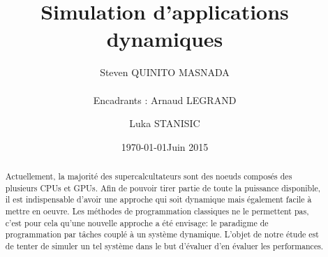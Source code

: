 \documentclass[smallextended]{svjour3}
\date{\today}
\title{}
\begin{document}
\newcommand{\AL}[2][inline]{\todo[color=green!50,#1]{\sf \textbf{AL:} #2}\xspace}
\newcommand{\LS}[2][inline]{\todo[color=green!50,#1]{\sf \textbf{LS:} #2}\xspace}

\let\oldcite=\cite
\renewcommand\cite[2][]{~\ifthenelse{\equal{#1}{}}{\oldcite{#2}}{\oldcite[#1]{#2}}\xspace}
\let\oldref=\ref
\def\ref#1{~\oldref{#1}\xspace}
\def\ie{i.e.,\xspace}
\def\eg{e.g.,\xspace}
\def\qrmspu{\texttt{QRM\_StarPU}\xspace}
\sloppy

\title{Simulation d'applications dynamiques%
}


\author{Steven QUINITO MASNADA  \\ \\
        Encadrants : Arnaud LEGRAND \and Luka STANISIC  %
}


\institute{%
}

\date{Juin 2015}

\maketitle


\begin{abstract}

Actuellement, la majorité des supercalcultateurs sont des noeuds
composés des plusieurs CPUs et GPUs. Afin de pouvoir tirer partie de
toute la puissance disponible, il est indispensable d'avoir une
approche qui soit dynamique mais également facile à mettre en
oeuvre. Les méthodes de programmation classiques ne le permettent
pas, c'est pour cela qu'une nouvelle approche a été envisage: le
paradigme de programmation par tâches couplé à un système
dynamique. L'objet de notre étude est de tenter de simuler un tel
système dans le but d'évaluer d'en évaluer les performances. 
\newpage
\end{abstract}
\end{document}
